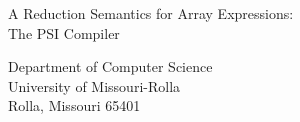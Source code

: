 

\thispagestyle{empty}
{
\Large
\begin{center}
A Reduction Semantics for Array Expressions:\\
The PSI Compiler
\end{center}



\vspace{1.5in}
\vspace{1.5in}

\hspace{0.0in}

\begin{center}
Department of Computer Science\\
University of Missouri-Rolla\\
Rolla, Missouri 65401
\end{center}
}
\newpage